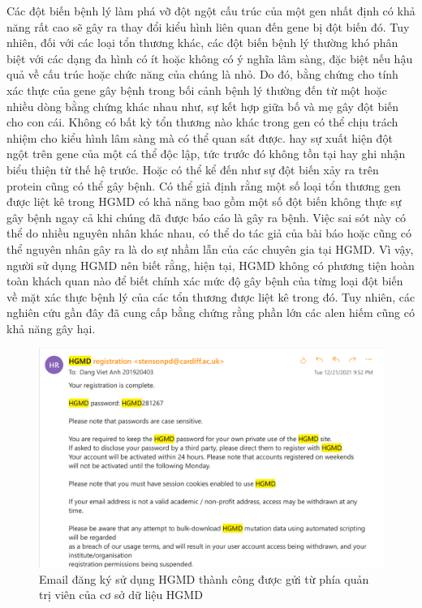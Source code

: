 \documentclass[../DoAn.tex]{subfiles}
\begin{document}
Các đột biến bệnh lý làm phá vỡ đột ngột cấu trúc của một gen nhất định có khả năng rất cao sẽ gây ra thay đổi kiểu hình liên quan đến gene bị đột biến đó. Tuy nhiên, đối với các loại tổn thương khác, các đột biến bệnh lý thường khó phân biệt với các dạng đa hình có ít hoặc không có ý nghĩa lâm sàng, đặc biệt nếu hậu quả về cấu trúc hoặc chức năng của chúng là nhỏ. Do đó, bằng chứng cho tính xác thực của gene gây bệnh trong bối cảnh bệnh lý thường đến từ một hoặc nhiều dòng bằng chứng khác nhau như, sự kết hợp giữa bố và mẹ gây đột biến cho con cái. Không có bất kỳ tổn thương nào khác trong gen có thể chịu trách nhiệm cho kiểu hình lâm sàng mà có thể quan sát được. hay sự xuất hiện đột ngột trên gene của một cá thể độc lập, tức trước đó không tồn tại hay ghi nhận biểu thiện từ thế hệ trước. Hoặc có thể kể đến như sự đột biến xảy ra trên protein cũng có thể gây bệnh. Có thể giả định rằng một số loại tổn thương gen được liệt kê trong HGMD có khả năng bao gồm một số đột biến không thực sự gây bệnh ngay cả khi chúng đã được báo cáo là gây ra bệnh. Việc sai sót này có thể do nhiều nguyên nhân khác nhau, có thể do tác giả của bài báo hoặc cũng có thể nguyên nhân gây ra là do sự nhầm lẫn của các chuyên gia tại HGMD. Vì vậy, người sử dụng HGMD nên biết rằng, hiện tại, HGMD không có phương tiện hoàn toàn khách quan nào để biết chính xác mức độ gây bệnh của từng loại đột biến về mặt xác thực bệnh lý của các tổn thương được liệt kê trong đó. Tuy nhiên, các nghiên cứu gần đây đã cung cấp bằng chứng rằng phần lớn các alen hiếm cũng có khả năng gây hại. 

\begin{figure}
\centering
\includegraphics[width=1.05\linewidth]{Hinh_ve/HGMD_register.png}
\caption{Email đăng ký sử dụng HGMD thành công được gửi từ phía quản trị viên của cơ sở dữ liệu HGMD}
\label{fig:hgmdregis}
\end{figure}
\end{document}
